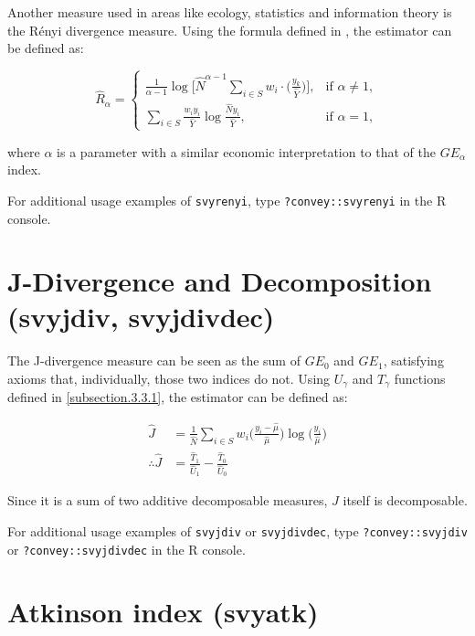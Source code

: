 \documentclass[]{book}
\begin{document}
Another measure used in areas like ecology, statistics and information
theory is the Rényi divergence measure. Using the formula defined in
\citet{langel2012}, the estimator can be defined as:

\[
\widehat{R}_\alpha =
\begin{cases}
\frac{1}{\alpha - 1} \log \bigg[ \widehat{N}^{\alpha - 1} \sum_{i \in S} w_i \cdot \bigg( \frac{y_k}{ \widehat{Y} } \bigg) \bigg], &\text{if } \alpha \neq 1, \\
\sum_{i \in S} \frac{w_i y_i}{ \widehat{Y}} \log \frac{\widehat{N} y_i}{\widehat{Y}}, &\text{if } \alpha = 1,
\end{cases}
\]

where \(\alpha\) is a parameter with a similar economic interpretation
to that of the \(GE_\alpha\) index.

For additional usage examples of \texttt{svyrenyi}, type
\texttt{?convey::svyrenyi} in the R console.

\section{J-Divergence and Decomposition (svyjdiv,
svyjdivdec)}\label{j-divergence-and-decomposition-svyjdiv-svyjdivdec}

The J-divergence measure \citep{rohde2016} can be seen as the sum of
\(GE_0\) and \(GE_1\), satisfying axioms that, individually, those two
indices do not. Using \(U_\gamma\) and \(T_\gamma\) functions defined in
\ref{subsection.3.3.1}, the estimator can be defined as:

\[
\begin{aligned}
\widehat{J} &= \frac{1}{\widehat{N}} \sum_{i \in S} w_i \bigg( \frac{ y_i - \widehat{\mu} }{ \widehat{\mu} } \bigg) \log \bigg( \frac{y_i}{\widehat{\mu}} \bigg) \\
\therefore \widehat{J} &= \frac{\widehat{T}_1}{\widehat{U}_1} - \frac{ \widehat{T}_0 }{ \widehat{U}_0 }
\end{aligned}
\]

Since it is a sum of two additive decomposable measures, \(J\) itself is
decomposable.

For additional usage examples of \texttt{svyjdiv} or
\texttt{svyjdivdec}, type \texttt{?convey::svyjdiv} or
\texttt{?convey::svyjdivdec} in the R console.

\section{Atkinson index (svyatk)}\label{atkinson-index-svyatk}
\end{document}
